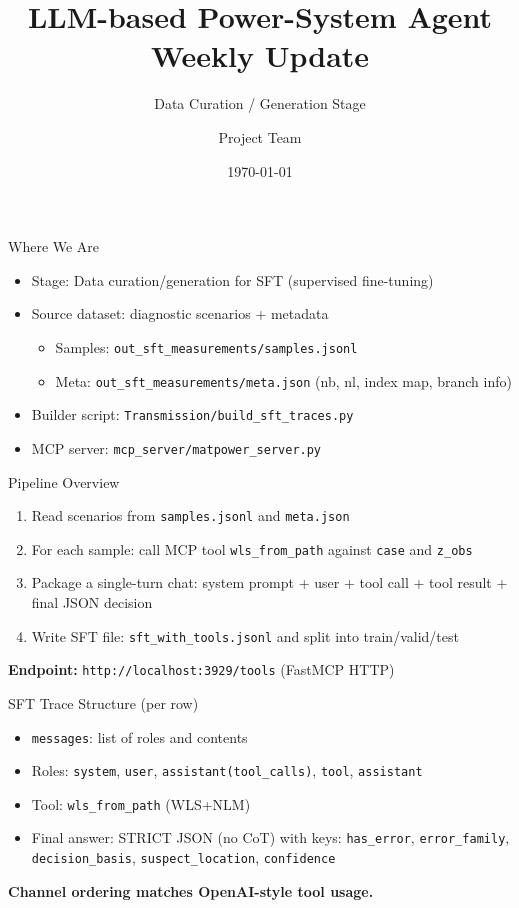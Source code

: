 \documentclass{beamer}
\title{LLM-based Power-System Agent\\Weekly Update}
\subtitle{Data Curation / Generation Stage}
\author{Project Team}
\date{\today}
\begin{document}
\frame{\titlepage}

\begin{frame}{Where We Are}
  \begin{itemize}
    \item Stage: Data curation/generation for SFT (supervised fine-tuning)
    \item Source dataset: diagnostic scenarios + metadata
      \begin{itemize}
        \item Samples: \texttt{out\_sft\_measurements/samples.jsonl}
        \item Meta: \texttt{out\_sft\_measurements/meta.json} (nb, nl, index map, branch info)
      \end{itemize}
    \item Builder script: \texttt{Transmission/build\_sft\_traces.py}
    \item MCP server: \texttt{mcp\_server/matpower\_server.py}
  \end{itemize}
\end{frame}

\begin{frame}{Pipeline Overview}
  \begin{enumerate}
    \item Read scenarios from \texttt{samples.jsonl} and \texttt{meta.json}
    \item For each sample: call MCP tool \texttt{wls\_from\_path} against \texttt{case} and \texttt{z\_obs}
    \item Package a single-turn chat: system prompt + user + tool call + tool result + final JSON decision
    \item Write SFT file: \texttt{sft\_with\_tools.jsonl} and split into train/valid/test
  \end{enumerate}
  \vspace{0.5em}
  \textbf{Endpoint:} \texttt{http://localhost:3929/tools} (FastMCP HTTP)
\end{frame}

\begin{frame}{SFT Trace Structure (per row)}
  \begin{itemize}
    \item \texttt{messages}: list of roles and contents
    \item Roles: \texttt{system}, \texttt{user}, \texttt{assistant(tool\_calls)}, \texttt{tool}, \texttt{assistant}
    \item Tool: \texttt{wls\_from\_path} (WLS+NLM)
    \item Final answer: STRICT JSON (no CoT) with keys: \texttt{has\_error}, \texttt{error\_family}, \texttt{decision\_basis}, \texttt{suspect\_location}, \texttt{confidence}
  \end{itemize}
  \vspace{0.5em}
  \textbf{Channel ordering matches OpenAI-style tool usage.}
\end{frame}
\end{document}
